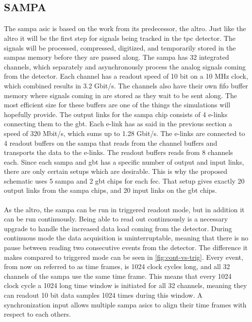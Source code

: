 \documentclass[a4paper, 12pt]{report}\dfrac{\right }{•}
\begin{document}
\subsection{SAMPA}
\label{subsec:sampa}
\paragraph{}
The \gls{sampa} \gls{asic} is based on the work from its predecessor, the \gls{altro}.
Just like the \gls{altro} it will be the first step for signals being tracked in the \gls{tpc} detector.
The signals will be processed, compressed, digitized, and temporarily stored in the \glspl{sampa} memory before they are passed along.
The \gls{sampa} has 32 integrated channels, which separately and asynchronously process the analog signals coming from the detector\cite{tdr-016}.
Each channel has a readout speed of 10 bit on a 10 MHz clock, which combined results in 3.2 Gbit/s.
The channels also have their own \gls{fifo} buffer memory where signals coming in are stored as they wait to be sent along.
The most efficient size for these buffers are one of the things the simulations will hopefully provide.
The output links for the \gls{sampa} chip consists of 4 e-links connecting them to the \gls{gbt}.
Each e-link has as said in the previous section a speed of 320 Mbit/s, which sums up to 1.28 Gbit/s\cite{tdr-015}.
The e-links are connected to 4 readout buffers on the \gls{sampa} that reads from the channel buffers and transports the data to the e-links.
The readout buffers reads from 8 channels each.
Since each \gls{sampa} and \gls{gbt} has a specific number of output and input links, there are only certain setups which are desirable.
This is why the proposed schematic uses 5 \gls{sampa} and 2 \gls{gbt} chips for each \gls{fec}.
That setup gives exactly 20 output links from the \gls{sampa} chips, and 20 input links on the \gls{gbt} chips.

\paragraph{}
As the \gls{altro}, the \gls{sampa} can be run in triggered readout mode, but in addition it can be run continuously.
Being able to read out continuously is a necessary upgrade to handle the increased data load coming from the detector.
During continuous mode the data acquisition is uninterruptable, meaning that there is no pause between reading two consecutive events from the detector.
The difference it makes compared to triggered mode can be seen in \ref{fig:cont-vs-trig}.
Every event, from now on referred to as time frames, is 1024 clock cycles long, and all 32 channels of the \gls{sampa} use the same time frame.
This means that every 1024 clock cycle a 1024 long time window is initiated for all 32 channels, meaning they can readout 10 bit data samples 1024 times during this window.
A synchronization input allows multiple \gls{sampa} \gls{asic}s to align their time frames with respect to each others.\cite{tdr-015}
\end{document}
